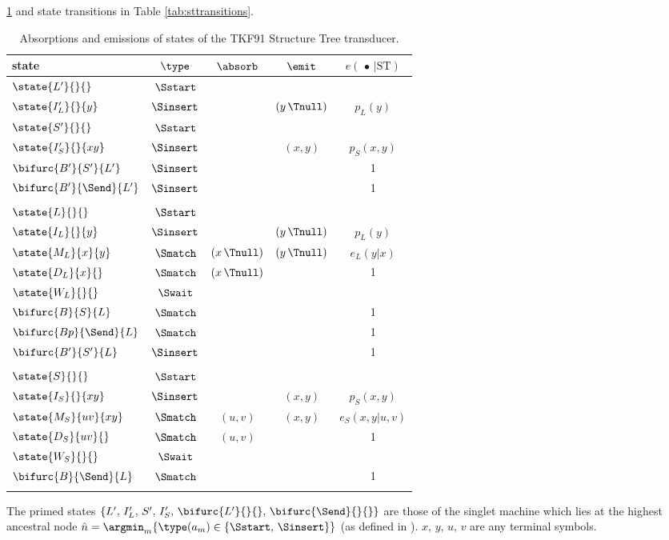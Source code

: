 
\ref{tab:stemissions} and state transitions in Table \ref{tab:sttransitions}.

\begin{table}[ht]
\centering
\begin{tabular}{lcccc}
state & $\type$ & $\absorb$ & $\emit$ & $e(\,\bullet\,|\mathrm{ST})$\\ \hline
$\state{L'}{}{}$ & $\Sstart$ \\
$\state{I'_L}{}{y}$ & $\Sinsert$ & & $(y\,\Tnull)$ & $p_L(y)$ \\
$\state{S'}{}{}$ & $\Sstart$ \\
$\state{I'_S}{}{xy}$ & $\Sinsert$ & & $(x,y)$ & $p_S(x,y)$ \\
$\bifurc{B'}{S'}{L'}$ & $\Sinsert$ & & & 1 \\
$\bifurc{B'}{\Send}{L'}$ & $\Sinsert$ & & & 1 \\
\\
$\state{L}{}{}$ & $\Sstart$ \\
$\state{I_L}{}{y}$ & $\Sinsert$ & & $(y\,\Tnull)$ & $p_L(y)$ \\
$\state{M_L}{x}{y}$ & $\Smatch$ & $(x\,\Tnull)$ & $(y\,\Tnull)$ & $e_L(y|x)$ \\
$\state{D_L}{x}{}$ & $\Smatch$ & $(x\,\Tnull)$ &  & 1 \\
$\state{W_L}{}{}$ & $\Swait$ \\
$\bifurc{B}{S}{L}$ & $\Smatch$ & & & 1 \\
$\bifurc{Bp}{\Send}{L}$ & $\Smatch$ & & & 1 \\
$\bifurc{B'}{S'}{L}$ & $\Sinsert$ & & & 1 \\
\\
$\state{S}{}{}$ & $\Sstart$ \\
$\state{I_S}{}{xy}$ & $\Sinsert$ & & $(x,y)$ & $p_S(x,y)$ \\
$\state{M_S}{uv}{xy}$ & $\Smatch$ & $(u,v)$ & $(x,y)$ & $e_S(x,y|u,v)$ \\
$\state{D_S}{uv}{}$ & $\Smatch$ & $(u,v)$ &  & 1 \\
$\state{W_S}{}{}$ & $\Swait$ \\
$\bifurc{B}{\Send}{L}$ & $\Smatch$ & & & 1 \\
\\
\end{tabular}
\caption{\label{tab:stemissions}Absorptions and emissions of states of the TKF91 Structure Tree transducer.}
\end{table}

The primed states $\{L',\,I'_L,\,S',\,I'_S,\,\bifurc{L'}{}{},\,\bifurc{\Send}{}{}\}$ are those of the singlet machine 
which lies at the highest ancestral node $\hat{n} = \argmin_m \{\type(a_m) \in \{\Sstart,\,\Sinsert\}\}$
(as defined in ).  $x,\,y,\,u,\,v$ are any terminal symbols.

